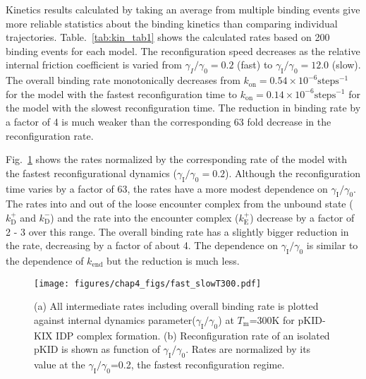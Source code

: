 \documentclass[../talant.diss.submit.tex]{subfiles}
\begin{document}
Kinetics results calculated by taking an average from multiple binding events
give more reliable statistics about the binding kinetics than comparing individual
trajectories.
Table.~\ref{tab:kin_tab1} shows the calculated rates based on 200 binding events
for each model. The reconfiguration speed decreases as the relative internal friction
coefficient is varied from $\gamma_I/\gamma_0 = 0.2$ (fast) to
$\gamma_\mathrm{I}/\gamma_0 = 12.0$ (slow). The overall binding rate monotonically decreases
from $k_\mathrm{on} = 0.54 \times 10^{-6} \mathrm{steps}^{-1}$ for the model with the
fastest reconfiguration time to $k_\mathrm{on} = 0.14 \times 10^{-6}\mathrm{steps}^{-1}$
for the model with the slowest reconfiguration time.
The reduction in binding rate by a factor of 4 is much weaker
than the corresponding 63 fold decrease in the reconfiguration rate.

Fig.~\ref{fig:fast_slowT300} shows the rates normalized by the corresponding rate of the model
with the fastest reconfigurational dynamics ($\gamma_\mathrm{I}/\gamma_0 = 0.2$).
Although the reconfiguration time varies by a factor of 63, the rates have a more modest dependence
on $\gamma_\mathrm{I}/\gamma_0$.
The rates into and out of the loose encounter complex from the unbound state ($k_\mathrm{D}^+$ and $k_\mathrm{D}^-$)
and the rate into the encounter complex ($k_\mathrm{E}^+$) decrease by a factor of 2 - 3 over this range.
The overall binding rate has a slightly bigger reduction in the rate, decreasing by a factor of about 4.
The dependence
on $\gamma_\mathrm{I}/\gamma_0$ is similar to the dependence of
$k_\mathrm{end}$ but the reduction is much less. 
%
\begin{figure} \begin{centering}
    \texttt{[image: figures/chap4\_figs/fast\_slowT300.pdf]}
    \caption{(a) All intermediate rates including overall binding rate is
      plotted against internal dynamics parameter($\gamma_{\mathrm{I}} / \gamma_0$)
      at $T_{\mathrm{m}}$=300K for pKID-KIX IDP complex formation. (b) Reconfiguration rate
      of an isolated pKID is shown as function of $\gamma_{\mathrm{I}} / \gamma_0$.
      Rates are normalized by its value at the $\gamma_{\mathrm{I}} / \gamma_0$=0.2,
      the fastest reconfiguration regime.} \label{fig:fast_slowT300}
  \end{centering}
\end{figure}                                                                                             
%
\end{document}
